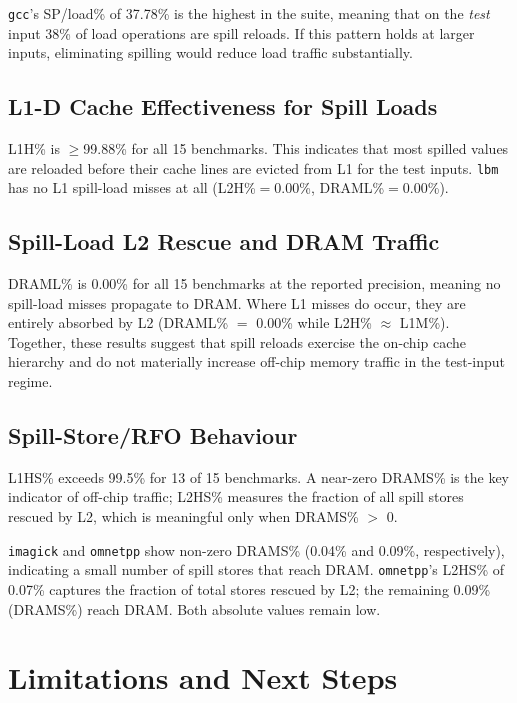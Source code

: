 \documentclass[conference]{IEEEtran}
\begin{document}
\texttt{gcc}'s SP/load\% of 37.78\% is the highest in the suite,
meaning that on the \emph{test} input 38\% of load operations are
spill reloads.  If this pattern holds at larger inputs, eliminating
spilling would reduce load traffic substantially.

\subsection{L1-D Cache Effectiveness for Spill Loads}

L1H\% is $\geq$99.88\% for all 15 benchmarks.
This indicates that most spilled values are reloaded before
their cache lines are evicted from L1 for the test inputs.
\texttt{lbm} has no L1 spill-load misses at all (L2H\%$=$0.00\%,
DRAML\%$=$0.00\%).

\subsection{Spill-Load L2 Rescue and DRAM Traffic}

DRAML\% is 0.00\% for all 15 benchmarks at the reported precision,
meaning no spill-load misses propagate to DRAM.
Where L1 misses do occur, they are entirely absorbed by L2
(DRAML\% $=$ 0.00\% while L2H\% $\approx$ L1M\%).
Together, these results suggest that spill reloads exercise
the on-chip cache hierarchy and do not materially increase
off-chip memory traffic in the test-input regime.

\subsection{Spill-Store/RFO Behaviour}

L1HS\% exceeds 99.5\% for 13 of 15 benchmarks.
A near-zero DRAMS\% is the key indicator of off-chip traffic;
L2HS\% measures the fraction of all spill stores rescued by L2,
which is meaningful only when DRAMS\% $>$ 0.

\texttt{imagick} and \texttt{omnetpp} show non-zero DRAMS\%
(0.04\% and 0.09\%, respectively), indicating a small number of
spill stores that reach DRAM.  \texttt{omnetpp}'s L2HS\% of 0.07\%
captures the fraction of total stores rescued by L2; the remaining
0.09\% (DRAMS\%) reach DRAM.  Both absolute values remain low.

\section{Limitations and Next Steps}
\end{document}
